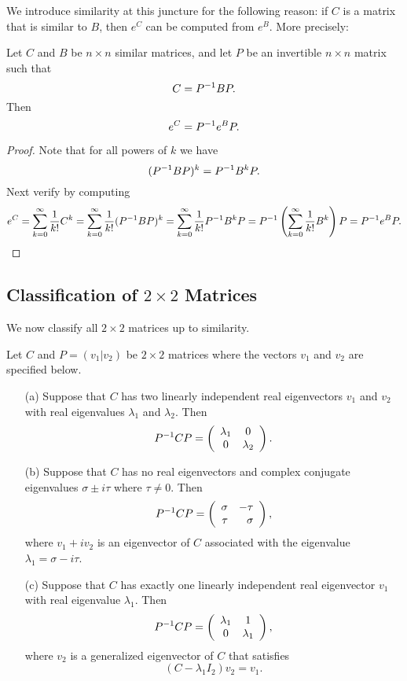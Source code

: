 \documentclass{ximera}
\begin{document}
We introduce similarity at this juncture for the following reason:
if $C$ is a matrix that is similar to $B$, then $e^C$ can be computed
from $e^B$.  More precisely:

\begin{lemma} \label{L:similarexp}
Let $C$ and $B$ be $n\times n$ similar matrices, and let $P$ be
an invertible $n\times n$ matrix such that
\[
C=P^{-1} BP.
\]
Then
\begin{equation}  \label{e:similarexp}
e^C = P^{-1} e^BP.
\end{equation}
\end{lemma}  

\begin{proof} Note that for all powers of $k$ we have
\[
(P^{-1} BP)^k = P^{-1} B^kP.
\]
Next verify  by computing
\[
e^C =\sum^{\infty}_{k=0} \frac{1}{k!}C^k
 =  \sum^{\infty}_{k=0} \frac{1}{k!}(P^{-1} BP)^k
=  \sum^{\infty}_{k=0} \frac{1}{k!}P^{-1} B^kP
= P^{-1}\left(\sum^{\infty}_{k=0} \frac{1}{k!}B^k\right)P
= P^{-1} e^B P.
\]
\end{proof}


\subsection*{Classification of $2\times 2$ Matrices}

We now classify all $2\times 2$ matrices up to similarity.

\begin{thm}  \label{T:putinform}
Let $C$ and $P=(v_1|v_2)$ be $2\times 2$ matrices where the vectors
$v_1$ and $v_2$ are specified below.
\begin{itemize}
\item[(a)]	Suppose that $C$ has two linearly independent
real eigenvectors $v_1$ and $v_2$ with real eigenvalues $\lambda_1$
and $\lambda_2$.  Then
\[
P^{-1} CP = \left(\begin{array}{cc} \lambda_1 & 0\\ 0 &\lambda_2\end{array}\right).
\]

\item[(b)]	Suppose that $C$ has no real eigenvectors and
complex conjugate eigenvalues $\sigma\pm i\tau$ where
$\tau\neq 0$.  Then
\[
P^{-1} CP = \left(\begin{array}{rr} \sigma & -\tau\\ \tau &\sigma\end{array}\right),
\]
where $v_1 + iv_2$ is an eigenvector of $C$ associated with the
eigenvalue $\lambda_1=\sigma-i\tau$.

\item[(c)]	Suppose that $C$ has exactly one linearly
independent real eigenvector $v_1$ with real eigenvalue $\lambda_1$.
Then
\[
P^{-1} CP = \left(\begin{array}{cc} \lambda_1 & 1\\ 0 &\lambda_1\end{array}\right),
\]
where  $v_2$ is a generalized eigenvector of $C$ that satisfies
\begin{equation}  \label{e:Cw=lw+v}
(C-\lambda_1 I_2) v_2 =  v_1.
\end{equation}

\end{itemize}
\end{thm}
\end{document}
